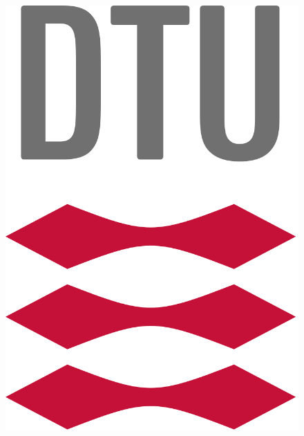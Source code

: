 
\begin{titlepage}


\begin{center}
    
\vspace{10mm}
\vspace{5mm}\\


\begin{figure}[t]
    \vspace*{-1cm}
    \hspace{14 cm}
    \includegraphics[scale=0.1]{fig/dtulogo.png}
\end{figure}


\end{center}
\end{titlepage}
